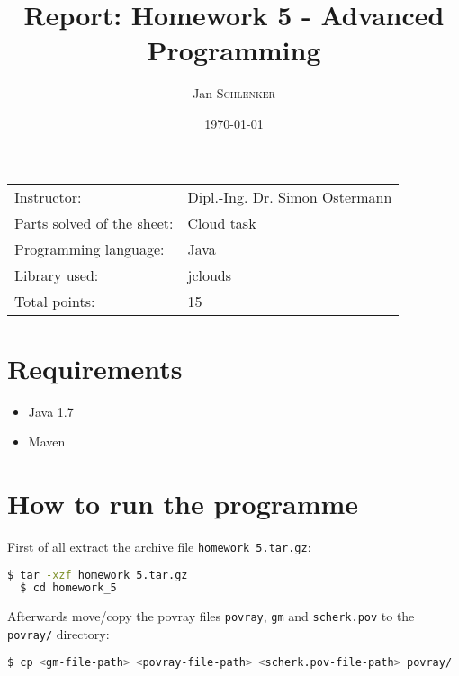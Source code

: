 \documentclass{article}
\title{Report: Homework 5 - Advanced Programming}%
\author{Jan \textsc{Schlenker}} %
\date{\today} %
\begin{document}
\maketitle %

\begin{center}
\begin{tabular}{l l}
Instructor: & Dipl.-Ing. Dr. Simon Ostermann \\
Parts solved of the sheet: & Cloud task \\
Programming language: & Java \\
Library used: & jclouds \\
Total points: & 15 \\
\end{tabular}
\end{center}


\section{Requirements}

\begin{itemize}
\item Java 1.7
\item Maven %
\end{itemize}

\section{How to run the programme}

First of all extract the archive file \texttt{homework\_5.tar.gz}:

\begin{lstlisting}[language=bash, deletekeywords={cd}]
  $ tar -xzf homework_5.tar.gz
  $ cd homework_5
\end{lstlisting}

Afterwards move/copy the povray files \texttt{povray}, \texttt{gm} and \texttt{scherk.pov} to the \texttt{povray/} directory:

\begin{lstlisting}[language=bash]
  $ cp <gm-file-path> <povray-file-path> <scherk.pov-file-path> povray/
\end{lstlisting}
\end{document}
